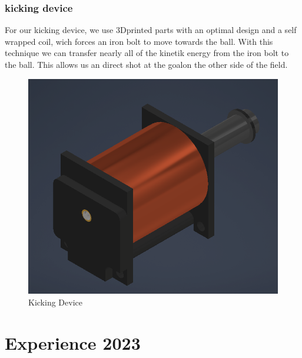 \documentclass{scrartcl}
\begin{document}
\subsubsection{kicking device}
For our kicking device, we use 3Dprinted parts with an optimal design and a self wrapped coil, wich forces an iron bolt to move towards the ball.
With this technique we can transfer nearly all of the kinetik energy from the iron bolt to the ball. This allows us an direct
shot at the goalon the other side of the field.

\begin{figure}[h]
    \centering
    \includegraphics[width=\textwidth]{img/Schuss.png}
    \caption{Kicking Device}
    \label{fig:kicking device}
\end{figure}

\section{Experience 2023}
\end{document}
